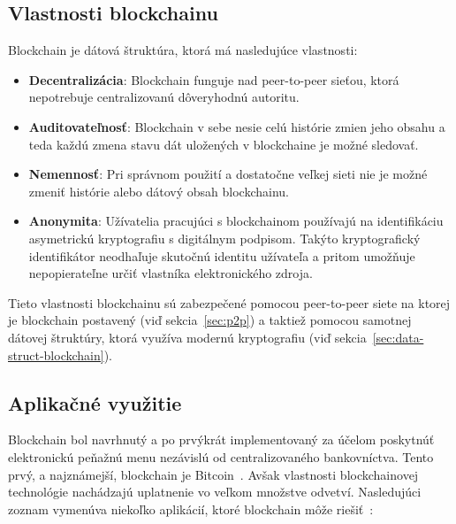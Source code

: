 \subsection{Vlastnosti blockchainu}
Blockchain je dátová štruktúra, ktorá má nasledujúce vlastnosti:
\begin{itemize}
	\item \textbf{Decentralizácia}: Blockchain funguje nad peer-to-peer sieťou, ktorá nepotrebuje centralizovanú dôveryhodnú autoritu.
	\item \textbf{Auditovateľnosť}: Blockchain v sebe nesie celú histórie zmien jeho obsahu a teda každú zmena stavu dát uložených v blockchaine je možné sledovať.
	\item \textbf{Nemennosť}: Pri správnom použití a dostatočne veľkej sieti nie je možné zmeniť histórie alebo dátový obsah blockchainu.
	\item \textbf{Anonymita}: Užívatelia pracujúci s blockchainom používajú na identifikáciu asymetrickú kryptografiu s digitálnym podpisom. Takýto kryptografický identifikátor neodhaľuje skutočnú identitu užívateľa a pritom umožňuje nepopierateľne určiť vlastníka elektronického zdroja.
\end{itemize}

Tieto vlastnosti blockchainu sú zabezpečené pomocou peer-to-peer siete na ktorej je blockchain postavený (viď sekcia~\ref{sec:p2p}) a taktiež pomocou samotnej dátovej štruktúry, ktorá využíva modernú kryptografiu (viď sekcia~\ref{sec:data-struct-blockchain}).~\cite{horizenAcademy}

\subsection{Aplikačné využitie}

Blockchain bol navrhnutý a po prvýkrát implementovaný za účelom poskytnúť elektronickú peňažnú menu nezávislú od centralizovaného bankovníctva. Tento prvý, a najznámejší, blockchain je Bitcoin~\cite{satoshiBitcoin}. Avšak vlastnosti blockchainovej technológie nachádzajú uplatnenie vo veľkom množstve odvetví. Nasledujúci zoznam vymenúva niekoľko aplikácií, ktoré blockchain môže riešiť~\cite{homoliakBlockchain}:

